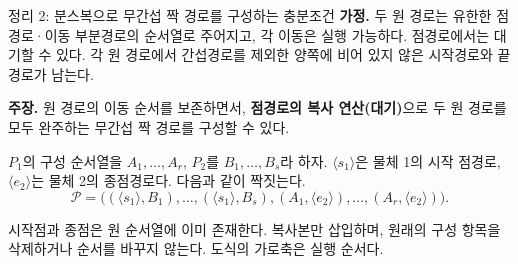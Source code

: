 \begin{frame}{정리 2: 분스복으로 무간섭 짝 경로를 구성하는 충분조건}
\small
\textbf{가정.} 두 원 경로는 유한한 점경로·이동 부분경로의 순서열로 주어지고,
각 이동은 실행 가능하다. 점경로에서는 대기할 수 있다.
각 원 경로에서 간섭경로를 제외한 양쪽에 비어 있지 않은 시작경로와 끝경로가 남는다.
\par\medskip
\textbf{주장.} 원 경로의 이동 순서를 보존하면서, \textbf{점경로의 복사 연산(대기)}으로
두 원 경로를 모두 완주하는 무간섭 짝 경로를 구성할 수 있다.
\par\medskip
$P_1$의 구성 순서열을 $A_1,\ldots,A_r$, $P_2$를 $B_1,\ldots,B_s$라 하자.
$\langle s_1\rangle$은 물체 1의 시작 점경로,
$\langle e_2\rangle$는 물체 2의 종점경로다. 다음과 같이 짝짓는다.
\begin{equation}
 \mathcal P=\bigl(
 (\langle s_1\rangle,B_1),\ldots,(\langle s_1\rangle,B_s),
 (A_1,\langle e_2\rangle),\ldots,(A_r,\langle e_2\rangle)
 \bigr).
 \tag{29}
\end{equation}
\begin{center}\end{center}
\footnotesize 시작점과 종점은 원 순서열에 이미 존재한다. 복사본만 삽입하며,
원래의 구성 항목을 삭제하거나 순서를 바꾸지 않는다. 도식의 가로축은 실행 순서다.
\end{frame}

